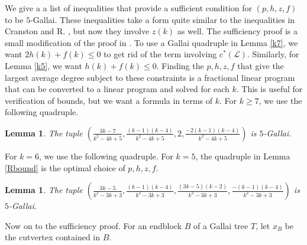 \documentclass[10pt]{article}
\theoremstyle{plain}
\newtheorem{lem}[thm]{Lemma}
\theoremstyle{definition}
\theoremstyle{remark}
\newcommand{\fancy}[1]{\mathcal{#1}}
\renewcommand{\L}{\fancy{L}}
\newcommand{\parens}[1]{\left( #1 \right)}
\begin{document}
We give a a list of inequalities that provide a sufficient condition for $(p,h,z,f)$ to be $5$-Gallai.  
These inequalities take a form quite similar to the inequalities in Cranston and R. \cite{DischargingLowerBound}, but now
they involve $z(k)$ as well.   The sufficiency proof is a small modification of the proof in \cite{DischargingLowerBound}. 
To use a Gallai quadruple in Lemma \ref{k7}, we want $2h(k) + f(k) \le 0$ to get rid of the term involving $c^*(\L)$.  Similarly,
for Lemma \ref{k5}, we want $h(k) + f(k) \le 0$.   Finding the $p,h,z,f$ that give the largest average degree subject to these constraints
is a fractional linear program that can be converted to a linear program and solved for each $k$.  This is useful
for verification of bounds, but we want a formula in terms of $k$.  For $k \ge 7$, we use the following quadruple.

\begin{lem}\label{Gallai7Up}
The tuple $\parens{\frac{3k-7}{k^2-4k+5}, \frac{(k-1)(k-4)}{k^2-4k+5}, 2, \frac{-2(k-1)(k-4)}{k^2-4k+5}}$ is $5$-Gallai.
\end{lem}

\noindent For $k=6$, we use the following quadruple.  For $k=5$, the quadruple in Lemma \ref{Rbound} is the optimal choice of $p,h,z,f$.

\begin{lem}\label{Gallai6Up}
The tuple $\parens{\frac{3k-5}{k^2-3k+3}, \frac{(k-1)(k-4)}{k^2-3k+3}, \frac{(3k-5)(k-2)}{k^2-3k+3}, \frac{-(k-1)(k-4)}{k^2-3k+3}}$ is $5$-Gallai.
\end{lem}

\noindent Now on to the sufficiency proof.  For an endblock $B$ of a Gallai tree $T$, let $x_B$ be the cutvertex contained in $B$.
\end{document}
